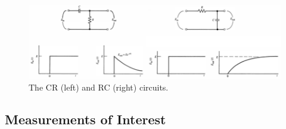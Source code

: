 \begin{figure}[ht]
    \centering
    \includegraphics[width=1.0\textwidth]{images/RC_CR_circuits.png}
    \caption{The CR (left) and RC (right) circuits.}
    \label{fig:RC_CR_circuits}
\end{figure}
\subsection{Measurements of Interest}
